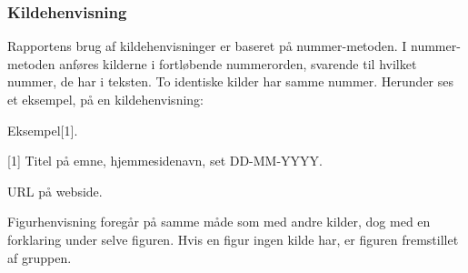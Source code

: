 \subsubsection{Kildehenvisning}
Rapportens brug af kildehenvisninger er baseret på nummer-metoden. I nummer-metoden anføres kilderne i fortløbende nummerorden, svarende til hvilket nummer, de har i teksten. To identiske kilder har samme nummer. Herunder ses et eksempel, på en kildehenvisning:

Eksempel[1].

[1] Titel på emne, hjemmesidenavn, set DD-MM-YYYY.

  URL på webside.

Figurhenvisning foregår på samme måde som med andre kilder, dog med en forklaring under selve figuren. Hvis en figur ingen kilde har, er figuren fremstillet af gruppen.
